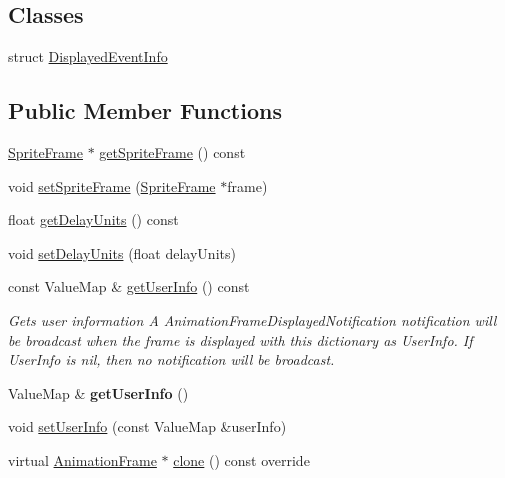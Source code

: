 \subsection*{Classes}
\begin{DoxyCompactItemize}
\item 
struct \hyperlink{structAnimationFrame_1_1DisplayedEventInfo}{Displayed\+Event\+Info}
\end{DoxyCompactItemize}
\subsection*{Public Member Functions}
\begin{DoxyCompactItemize}
\item 
\hyperlink{classSpriteFrame}{Sprite\+Frame} $\ast$ \hyperlink{classAnimationFrame_a474a334b0df47b93e3f6bd64f81ad440}{get\+Sprite\+Frame} () const
\item 
void \hyperlink{classAnimationFrame_afd21a7ef4ceb50204e79ed6e6ac80530}{set\+Sprite\+Frame} (\hyperlink{classSpriteFrame}{Sprite\+Frame} $\ast$frame)
\item 
float \hyperlink{classAnimationFrame_a79c7bbdfce3d7c977571eec61c7bfa72}{get\+Delay\+Units} () const
\item 
void \hyperlink{classAnimationFrame_afb9b22fd6b69fe33245df07fec1ce125}{set\+Delay\+Units} (float delay\+Units)
\item 
const Value\+Map \& \hyperlink{classAnimationFrame_a8af9011b2cf3227e52134e7a42aad1dc}{get\+User\+Info} () const
\begin{DoxyCompactList}\small\item\em Gets user information A Animation\+Frame\+Displayed\+Notification notification will be broadcast when the frame is displayed with this dictionary as User\+Info. If User\+Info is nil, then no notification will be broadcast. \end{DoxyCompactList}\item 
\mbox{\label{classAnimationFrame_a5149191a1ec4d4441517d8bbfc45ca99}} 
Value\+Map \& {\bfseries get\+User\+Info} ()
\item 
void \hyperlink{classAnimationFrame_a5478d94008d0c0980e1618a4443f7c15}{set\+User\+Info} (const Value\+Map \&user\+Info)
\item 
virtual \hyperlink{classAnimationFrame}{Animation\+Frame} $\ast$ \hyperlink{classAnimationFrame_adaf2f0c5da7138f837b06518daa18a87}{clone} () const override
\item 

\end{DoxyCompactItemize}
